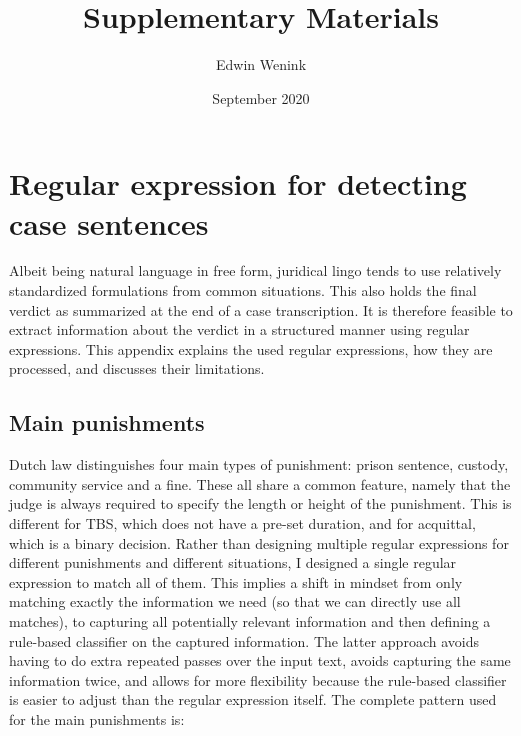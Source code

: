 \documentclass[a4paper]{article}
\title{Supplementary Materials}
\date{September 2020}
\author{Edwin Wenink}
\begin{document}
\maketitle
\tableofcontents

\section{Regular expression for detecting case sentences}\label{sec:regex}

Albeit being natural language in free form, juridical lingo tends to use relatively standardized formulations from common situations.
This also holds the final verdict as summarized at the end of a case transcription.
It is therefore feasible to extract information about the verdict in a structured manner using regular expressions.
This appendix explains the used regular expressions, how they are processed, and discusses their limitations.

\subsection{Main punishments}

Dutch law distinguishes four main types of punishment: prison sentence, custody, community service and a fine.
These all share a common feature, namely that the judge is always required to specify the length or height of the punishment.
This is different for TBS, which does not have a pre-set duration, and for acquittal, which is a binary decision.
Rather than designing multiple regular expressions for different punishments and different situations, I designed a single regular expression to match all of them.
This implies a shift in mindset from only matching exactly the information we need (so that we can directly use all matches), to capturing all potentially relevant information and then defining a rule-based classifier on the captured information.
The latter approach avoids having to do extra repeated passes over the input text, avoids capturing the same information twice, and allows for more flexibility because the rule-based classifier is easier to adjust than the regular expression itself.
The complete pattern used for the main punishments is:
\end{document}
